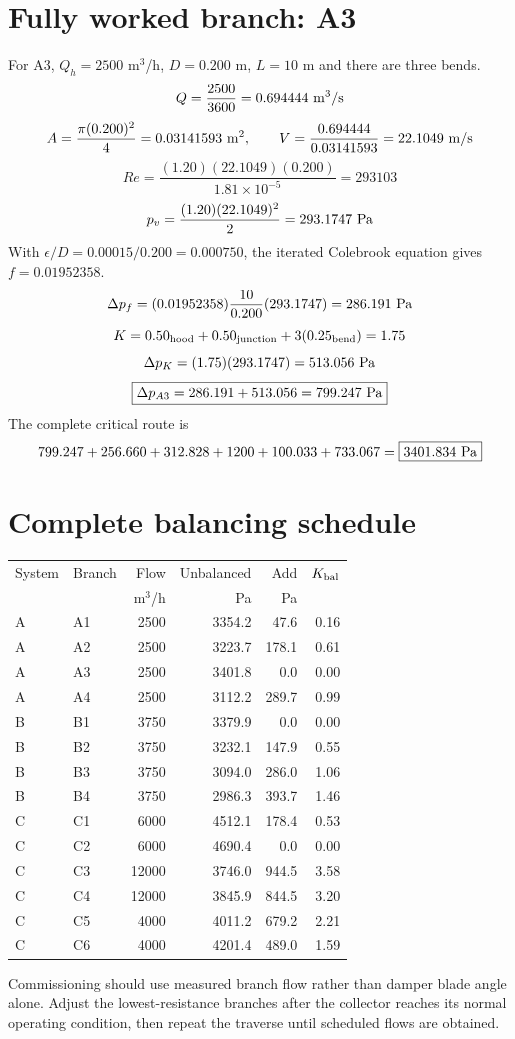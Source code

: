 \documentclass[11pt,a4paper]{article}
\begin{document}
\clearpage
\section{Fully worked branch: A3}
For A3, $Q_h=2500$ m$^3$/h, $D=0.200$ m, $L=10$ m and there are three bends.
\[
Q=\frac{2500}{3600}=0.694444\ {\rm m^3/s}
\]
\[
A=\frac{\pi(0.200)^2}{4}=0.03141593\ {\rm m^2},\qquad
V=\frac{0.694444}{0.03141593}=22.1049\ {\rm m/s}
\]
\[
Re=\frac{(1.20)(22.1049)(0.200)}{1.81\times10^{-5}}=293103
\]
\[
p_v=\frac{(1.20)(22.1049)^2}{2}=293.1747\ {\rm Pa}
\]
With $\epsilon/D=0.00015/0.200=0.000750$, the iterated Colebrook equation gives $f=0.01952358$.
\[
\Delta p_f=(0.01952358)\frac{10}{0.200}(293.1747)=286.191\ {\rm Pa}
\]
\[
K=0.50_{\rm hood}+0.50_{\rm junction}+3(0.25_{\rm bend})=1.75
\]
\[
\Delta p_K=(1.75)(293.1747)=513.056\ {\rm Pa}
\]
\[
\boxed{\Delta p_{A3}=286.191+513.056=799.247\ {\rm Pa}}
\]
The complete critical route is
\[
799.247+256.660+312.828+1200+100.033+733.067
=\boxed{3401.834\ {\rm Pa}}
\]

\clearpage
\section{Complete balancing schedule}
\begin{center}\small
\begin{longtable}{llrrrr}
\toprule
System & Branch & Flow & Unbalanced & Add & $K_{\rm bal}$\\
 & & m$^3$/h & Pa & Pa &\\
\midrule
\endhead
A & A1 & 2500 & 3354.2 & 47.6 & 0.16 \\
A & A2 & 2500 & 3223.7 & 178.1 & 0.61 \\
A & A3 & 2500 & 3401.8 & 0.0 & 0.00 \\
A & A4 & 2500 & 3112.2 & 289.7 & 0.99 \\
B & B1 & 3750 & 3379.9 & 0.0 & 0.00 \\
B & B2 & 3750 & 3232.1 & 147.9 & 0.55 \\
B & B3 & 3750 & 3094.0 & 286.0 & 1.06 \\
B & B4 & 3750 & 2986.3 & 393.7 & 1.46 \\
C & C1 & 6000 & 4512.1 & 178.4 & 0.53 \\
C & C2 & 6000 & 4690.4 & 0.0 & 0.00 \\
C & C3 & 12000 & 3746.0 & 944.5 & 3.58 \\
C & C4 & 12000 & 3845.9 & 844.5 & 3.20 \\
C & C5 & 4000 & 4011.2 & 679.2 & 2.21 \\
C & C6 & 4000 & 4201.4 & 489.0 & 1.59 \\
\bottomrule
\end{longtable}
\end{center}
Commissioning should use measured branch flow rather than damper blade angle alone. Adjust the lowest-resistance branches after the collector reaches its normal operating condition, then repeat the traverse until scheduled flows are obtained.
\end{document}
